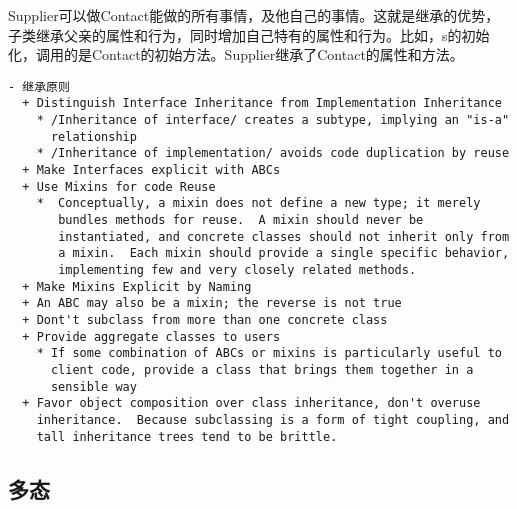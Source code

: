 Supplier可以做Contact能做的所有事情，及他自己的事情。这就是继承的优势，子类继承父亲的属性和行为，同时增加自己特有的属性和行为。比如，s的初始化，调用的是Contact的初始方法。Supplier继承了Contact的属性和方法。
\begin{framed}
  \begin{verbatim}
- 继承原则
  + Distinguish Interface Inheritance from Implementation Inheritance
    * /Inheritance of interface/ creates a subtype, implying an "is-a"
      relationship
    * /Inheritance of implementation/ avoids code duplication by reuse
  + Make Interfaces explicit with ABCs
  + Use Mixins for code Reuse
    *  Conceptually, a mixin does not define a new type; it merely
       bundles methods for reuse.  A mixin should never be
       instantiated, and concrete classes should not inherit only from
       a mixin.  Each mixin should provide a single specific behavior,
       implementing few and very closely related methods.
  + Make Mixins Explicit by Naming
  + An ABC may also be a mixin; the reverse is not true
  + Dont't subclass from more than one concrete class
  + Provide aggregate classes to users
    * If some combination of ABCs or mixins is particularly useful to
      client code, provide a class that brings them together in a
      sensible way
  + Favor object composition over class inheritance, don't overuse
    inheritance.  Because subclassing is a form of tight coupling, and
    tall inheritance trees tend to be brittle. 
\end{verbatim}
\end{framed}


\subsection{多态}


